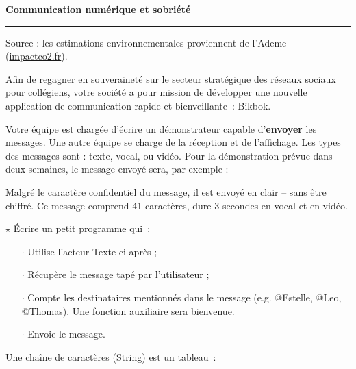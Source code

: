 
\begin{center}
  \Large\bf Communication numérique et sobriété
\end{center}

\noindent\rule{\linewidth}{.6pt}

\bigskip

Source : les estimations environnementales proviennent de l'Ademe (\url{impactco2.fr}).


Afin de regagner en souveraineté sur le secteur stratégique des réseaux sociaux pour collégiens, votre société a pour mission de développer une nouvelle application de communication rapide et bienveillante~: Bikbok.
\medskip

Votre équipe est chargée d'écrire un démonstrateur capable d'\textbf{envoyer} les messages. Une autre équipe se charge de la réception et de l'affichage. Les types des messages sont :
texte, vocal, ou vidéo.
Pour la démonstration prévue dans deux semaines, le message envoyé sera, par exemple :

\medskip
\centerline{}
\medskip

Malgré le caractère confidentiel du message, il est envoyé en clair -- sans être chiffré. Ce message comprend 41 caractères, dure 3 secondes en vocal et en vidéo.

$\star$ Écrire un petit programme qui~:

\begin{itemize}[itemsep=0.2ex]
\item[$\cdot$] Utilise l'acteur Texte ci-après ;
\item[$\cdot$] Récupère le message tapé par l'utilisateur ;
\item[$\cdot$] Compte les destinataires mentionnés dans le message (e.g. @Estelle, @Leo, @Thomas). Une fonction auxiliaire sera bienvenue.
\item[$\cdot$] Envoie le message.
\end{itemize}
Une chaîne de caractères (String) est un tableau~:

